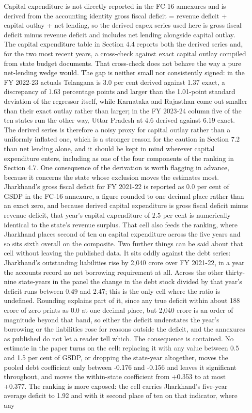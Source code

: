\documentclass[12pt,a4paper]{article}
\begin{document}
Capital expenditure is not directly reported in the FC-16 annexures and is derived from the accounting identity gross fiscal deficit = revenue deficit + capital outlay + net lending, so the derived capex series used here is gross fiscal deficit minus revenue deficit and includes net lending alongside capital outlay. The capital expenditure table in Section 4.4 reports both the derived series and, for the two most recent years, a cross-check against exact capital outlay compiled from state budget documents. That cross-check does not behave the way a pure net-lending wedge would. The gap is neither small nor consistently signed: in the FY 2022-23 actuals Telangana is 3.0 per cent derived against 1.37 exact, a discrepancy of 1.63 percentage points and larger than the 1.01-point standard deviation of the regressor itself, while Karnataka and Rajasthan come out smaller than their exact outlay rather than larger; in the FY 2023-24 column five of the ten states run the other way, Uttar Pradesh at 4.6 derived against 6.19 exact. The derived series is therefore a noisy proxy for capital outlay rather than a uniformly inflated one, which is a stronger reason for the caution in Section 7.2 than net lending alone, and it should be kept in mind wherever capital expenditure enters, including as one of the four components of the ranking in Section 4.7. One consequence of the derivation is worth flagging in advance, because it concerns the state whose exclusion moves the estimates most. Jharkhand's gross fiscal deficit for FY 2021-22 is reported as 0.0 per cent of GSDP in the FC-16 annexure, a figure rounded to one decimal place rather than an exact zero, and because derived capital expenditure is gross fiscal deficit minus revenue deficit, that year's capital expenditure of 2.5 per cent is numerically identical to the state's revenue surplus. That cell also feeds the ranking, where Jharkhand places second of ten on capital expenditure across the five years and so sits sixth overall on the composite. Two further things can be said about that cell without leaving the published data. It sits oddly against the debt series: Jharkhand's outstanding liabilities rise by 2,040 crore over FY 2021-22, in a year the accounts record no net borrowing requirement at all. Across the other thirty-nine state-years in the panel the change in the debt stock divided by that year's deficit runs between 0.49 and 2.47; this is the only cell where the ratio is undefined. Rounding explains part of it, since any true deficit within about 188 crore of zero prints as 0.0 at one decimal place, but 2,040 crore is an order of magnitude beyond that band, so either the deficit understates the year's borrowing or the liabilities rose for reasons outside the deficit, and the annexures as published do not let a reader tell which. The consequence is contained. No estimate in the paper turns on the cell: replacing it with any value between 0.5 and 1.5 per cent of GSDP, or dropping the state-year altogether, moves the pooled debt coefficient only between -0.176 and -0.156 and leaves it significant throughout, and moves the within-state coefficient from +0.353 to at most +0.377. The ranking is more exposed: the cell carries Jharkhand's five-year average deficit to 1.92 and with it second place of ten on that indicator, where any 
\end{document}
